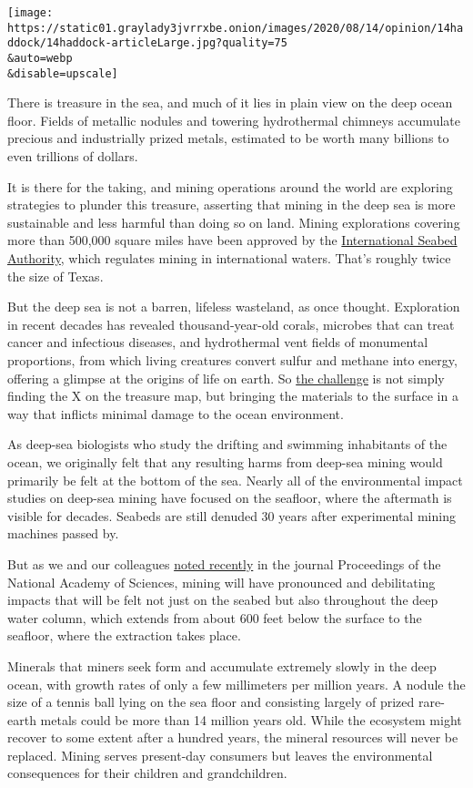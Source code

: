 \texttt{[image: https://static01.graylady3jvrrxbe.onion/images/2020/08/14/opinion/14haddock/14haddock-articleLarge.jpg?quality=75\\\&auto=webp\\\&disable=upscale]}

There is treasure in the sea, and much of it lies in plain view on the
deep ocean floor. Fields of metallic nodules and towering hydrothermal
chimneys accumulate precious and industrially prized metals, estimated
to be worth many billions to even trillions of dollars.

It is there for the taking, and mining operations around the world are
exploring strategies to plunder this treasure, asserting that mining in
the deep sea is more sustainable and less harmful than doing so on land.
Mining explorations covering more than 500,000 square miles have been
approved by the \href{https://www.isa.org.jm/}{International Seabed
Authority}, which regulates mining in international waters. That's
roughly twice the size of Texas.

But the deep sea is not a barren, lifeless wasteland, as once thought.
Exploration in recent decades has revealed thousand-year-old corals,
microbes that can treat cancer and infectious diseases, and hydrothermal
vent fields of monumental proportions, from which living creatures
convert sulfur and methane into energy, offering a glimpse at the
origins of life on earth. So \href{https://rdcu.be/b5r3o}{the challenge}
is not simply finding the X on the treasure map, but bringing the
materials to the surface in a way that inflicts minimal damage to the
ocean environment.

As deep-sea biologists who study the drifting and swimming inhabitants
of the ocean, we originally felt that any resulting harms from deep-sea
mining would primarily be felt at the bottom of the sea. Nearly all of
the environmental impact studies on deep-sea mining have focused on the
seafloor, where the aftermath is visible for decades. Seabeds are still
denuded 30 years after experimental mining machines passed by.

But as we and our colleagues
\href{https://www.pnas.org/content/117/30/17455}{noted recently} in the
journal Proceedings of the National Academy of Sciences, mining will
have pronounced and debilitating impacts that will be felt not just on
the seabed but also throughout the deep water column, which extends from
about 600 feet below the surface to the seafloor, where the extraction
takes place.

Minerals that miners seek form and accumulate extremely slowly in the
deep ocean, with growth rates of only a few millimeters per million
years. A nodule the size of a tennis ball lying on the sea floor and
consisting largely of prized rare-earth metals could be more than 14
million years old. While the ecosystem might recover to some extent
after a hundred years, the mineral resources will never be replaced.
Mining serves present-day consumers but leaves the environmental
consequences for their children and grandchildren.

